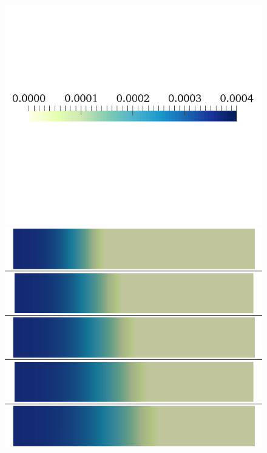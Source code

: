 \documentclass{article}
\begin{document}
\begin{figure}
\begin{minipage}{0.5\textwidth}
\includegraphics[trim=0cm 7cm 0cm 6cm, clip=true, width=1\linewidth]{legend_cai}
\includegraphics[trim=0cm 0cm 0cm 0cm, clip=true, width=1\linewidth]{cai_sigma}
    \end{minipage}
    \begin{minipage}{0.5\textwidth}

\end{minipage}
\end{figure}
\end{document}

